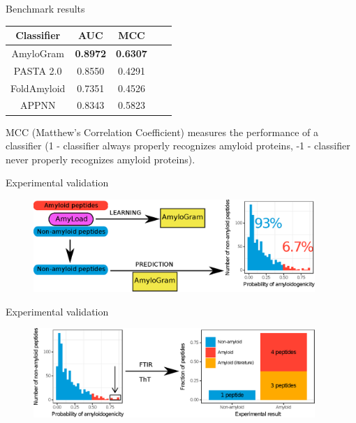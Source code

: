 \documentclass{beamer}\usepackage[]{graphicx}\usepackage[]{color}
\begin{document}
\begin{frame}{Benchmark results}

\begin{table}[ht]
\centering

\begin{tabular}{ccccc}
  \toprule
Classifier & AUC & MCC \\ 
  \midrule
AmyloGram & \textbf{0.8972} & \textbf{0.6307} \\ 
  \rowcolor{white}PASTA 2.0 \citep{walsh_pasta_2014} & 0.8550 & 0.4291  \\ 
   FoldAmyloid \citep{garbuzynskiy_foldamyloid:_2010} & 0.7351 & 0.4526  \\ 
  \rowcolor{white}APPNN \citep{familia_prediction_2015} & 0.8343 & 0.5823  \\ 
   \bottomrule
\end{tabular}
\end{table}

MCC (Matthew's Correlation Coefficient) measures the performance of a classifier (1 - classifier always properly recognizes amyloid proteins, -1 - classifier never properly recognizes amyloid proteins).

\footnotesize

\end{frame}



\begin{frame}{Experimental validation}
\begin{figure} 
\includegraphics[width=0.95\textwidth]{static_figure/diagram1.eps}
\end{figure}
\end{frame}

\begin{frame}{Experimental validation}
\begin{figure} 
\includegraphics[width=0.95\textwidth]{static_figure/diagram2.eps}
\end{figure}
\end{frame}
\end{document}
